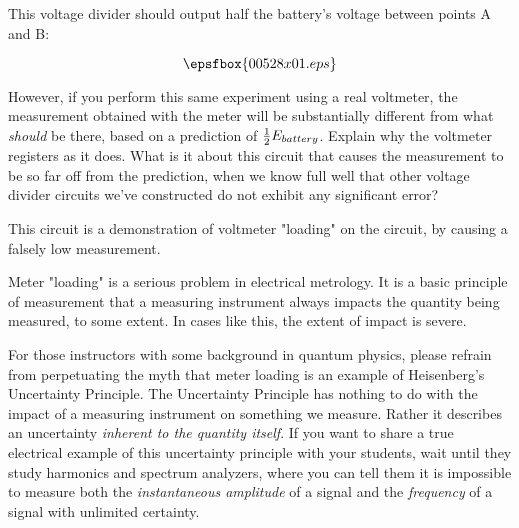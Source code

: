 

This voltage divider should output half the battery's voltage between points A and B:

$$\epsfbox{00528x01.eps}$$

However, if you perform this same experiment using a real voltmeter, the measurement obtained with the meter will be substantially different from what {\it should} be there, based on a prediction of ${1 \over 2}E_{battery}$.  Explain why the voltmeter registers as it does.  What is it about this circuit that causes the measurement to be so far off from the prediction, when we know full well that other voltage divider circuits we've constructed do not exhibit any significant error?







This circuit is a demonstration of voltmeter "loading" on the circuit, by causing a falsely low measurement.







Meter "loading" is a serious problem in electrical metrology.  It is a basic principle of measurement that a measuring instrument always impacts the quantity being measured, to some extent.  In cases like this, the extent of impact is severe.

For those instructors with some background in quantum physics, please refrain from perpetuating the myth that meter loading is an example of Heisenberg's Uncertainty Principle.  The Uncertainty Principle has nothing to do with the impact of a measuring instrument on something we measure.  Rather it describes an uncertainty {\it inherent to the quantity itself}.  If you want to share a true electrical example of this uncertainty principle with your students, wait until they study harmonics and spectrum analyzers, where you can tell them it is impossible to measure both the {\it instantaneous amplitude} of a signal and the {\it frequency} of a signal with unlimited certainty.




